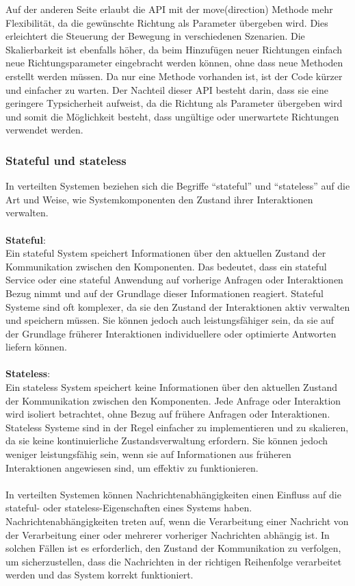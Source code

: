 \documentclass[../vs-script-first-v01.tex]{subfiles}
\begin{document}
Auf der anderen Seite erlaubt die API mit der move(direction) Methode mehr Flexibilität, da die gewünschte Richtung als Parameter übergeben wird. Dies erleichtert die Steuerung der Bewegung in verschiedenen Szenarien. Die Skalierbarkeit ist ebenfalls höher, da beim Hinzufügen neuer Richtungen einfach neue Richtungsparameter eingebracht werden können, ohne dass neue Methoden erstellt werden müssen. Da nur eine Methode vorhanden ist, ist der Code kürzer und einfacher zu warten. Der Nachteil dieser API besteht darin, dass sie eine geringere Typsicherheit aufweist, da die Richtung als Parameter übergeben wird und somit die Möglichkeit besteht, dass ungültige oder unerwartete Richtungen verwendet werden.

\subsubsection{Stateful und stateless}
In verteilten Systemen beziehen sich die Begriffe \enquote{stateful} und \enquote{stateless} auf die Art und Weise, wie Systemkomponenten den Zustand ihrer Interaktionen verwalten.
\\\\
\textbf{Stateful}:\\
Ein stateful System speichert Informationen über den aktuellen Zustand der Kommunikation zwischen den Komponenten. Das bedeutet, dass ein stateful Service oder eine stateful Anwendung auf vorherige Anfragen oder Interaktionen Bezug nimmt und auf der Grundlage dieser Informationen reagiert. Stateful Systeme sind oft komplexer, da sie den Zustand der Interaktionen aktiv verwalten und speichern müssen. Sie können jedoch auch leistungsfähiger sein, da sie auf der Grundlage früherer Interaktionen individuellere oder optimierte Antworten liefern können.
\\\\
\textbf{Stateless}:\\
Ein stateless System speichert keine Informationen über den aktuellen Zustand der Kommunikation zwischen den Komponenten. Jede Anfrage oder Interaktion wird isoliert betrachtet, ohne Bezug auf frühere Anfragen oder Interaktionen. Stateless Systeme sind in der Regel einfacher zu implementieren und zu skalieren, da sie keine kontinuierliche Zustandsverwaltung erfordern. Sie können jedoch weniger leistungsfähig sein, wenn sie auf Informationen aus früheren Interaktionen angewiesen sind, um effektiv zu funktionieren.
\\\\
In verteilten Systemen können Nachrichtenabhängigkeiten einen Einfluss auf die stateful- oder stateless-Eigenschaften eines Systems haben. Nachrichtenabhängigkeiten treten auf, wenn die Verarbeitung einer Nachricht von der Verarbeitung einer oder mehrerer vorheriger Nachrichten abhängig ist. In solchen Fällen ist es erforderlich, den Zustand der Kommunikation zu verfolgen, um sicherzustellen, dass die Nachrichten in der richtigen Reihenfolge verarbeitet werden und das System korrekt funktioniert.
\end{document}
